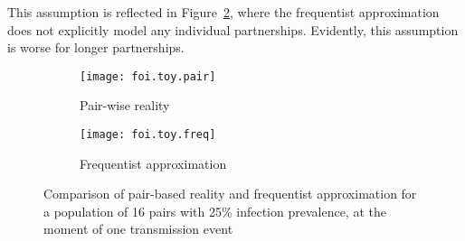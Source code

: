 This assumption is reflected in Figure~\ref{fig:foi.toy.freq},
where the frequentist approximation does not explicitly model any individual partnerships.
Evidently, this assumption is worse for longer partnerships.
\begin{figure}
  \begin{subfigure}{.5\linewidth}
    \centering\texttt{[image: foi.toy.pair]}
    \caption{Pair-wise reality}
    \label{fig:foi.toy.pair}
  \end{subfigure}%
  \begin{subfigure}{.5\linewidth}
    \centering\texttt{[image: foi.toy.freq]}
    \caption{Frequentist approximation}
    \label{fig:foi.toy.freq}
  \end{subfigure}
  \caption{Comparison of pair-based reality and frequentist approximation
    for a population of 16 pairs with 25\% infection prevalence,
    at the moment of one transmission event}
  \label{fig:foi.toy}
\end{figure}
